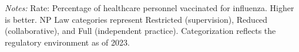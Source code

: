 \begin{table}[htbp]
    \centering
    \caption{Summary of ASC-8: Influenza Vaccination Coverage by Authority and Year}
    \label{tab:asc_rate_8}
    \vspace{0.2cm}
    \vspace{0.1cm}
    \begin{minipage}{\textwidth}
        \footnotesize \textit{Notes:} Rate: Percentage of healthcare personnel vaccinated for influenza. Higher is better. NP Law categories represent Restricted (supervision), Reduced (collaborative), and Full (independent practice). Categorization reflects the regulatory environment as of 2023.
    \end{minipage}
\end{table}
